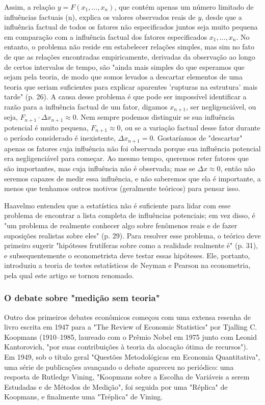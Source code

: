 \documentclass[12pt]{article}
\begin{document}
Assim, a relação \( y = F(x_1, \ldots, x_n) \), que contém apenas um número limitado de influências factuais (n), explica os valores observados reais de \( y \), desde que a influência factual de todos os fatores não especificados juntos seja muito pequena em comparação com a influência factual dos fatores especificados \( x_1, \ldots, x_n \). No entanto, o problema não reside em estabelecer relações simples, mas sim no fato de que as relações encontradas empiricamente, derivadas da observação ao longo de certos intervalos de tempo, são "ainda mais simples do que esperamos que sejam pela teoria, de modo que somos levados a descartar elementos de uma teoria que seriam suficientes para explicar aparentes 'rupturas na estrutura' mais tarde" (p. 26). A causa desse problema é que pode ser impossível identificar a razão para a influência factual de um fator, digamos \( x_{n+1} \), ser negligenciável, ou seja, \( F_{n+1} \cdot \Delta x_{n+1} \approx 0 \). Nem sempre podemos distinguir se sua influência potencial é muito pequena, \( F_{n+1} \approx 0 \), ou se a variação factual desse fator durante o período considerado é inexistente, \( \Delta x_{n+1} = 0 \). Gostaríamos de "descartar" apenas os fatores cuja influência não foi observada porque sua influência potencial era negligenciável para começar. Ao mesmo tempo, queremos reter fatores que são importantes, mas cuja influência não é observada; mas se \( \Delta x \approx 0 \), então não seremos capazes de medir essa influência, e não saberemos que ela é importante, a menos que tenhamos outros motivos (geralmente teóricos) para pensar isso.

Haavelmo entendeu que a estatística não é suficiente para lidar com esse problema de encontrar a lista completa de influências potenciais; em vez disso, é "um problema de realmente conhecer algo sobre fenômenos reais e de fazer suposições realistas sobre eles" (p. 29). Para resolver esse problema, o teórico deve primeiro sugerir "hipóteses frutíferas sobre como a realidade realmente é" (p. 31), e subsequentemente o econometrista deve testar essas hipóteses. Ele, portanto, introduziu a teoria de testes estatísticos de Neyman e Pearson na econometria, pela qual este artigo se tornou renomado.

\subsubsection{\textbf{O debate sobre "medição sem teoria"}}
Outro dos primeiros debates econômicos começou com uma extensa resenha de livro escrita em 1947 para a "The Review of Economic Statistics" por Tjalling C. Koopmans (1910–1985, laureado com o Prêmio Nobel em 1975 junto com Leonid Kantorovich, "por suas contribuições à teoria da alocação ótima de recursos"). Em 1949, sob o título geral "Questões Metodológicas em Economia Quantitativa", uma série de publicações avançando o debate apareceu no periódico: uma resposta de Rutledge Vining, "Koopmans sobre a Escolha de Variáveis a serem Estudadas e de Métodos de Medição", foi seguida por uma "Réplica" de Koopmans, e finalmente uma "Tréplica" de Vining.
\end{document}
